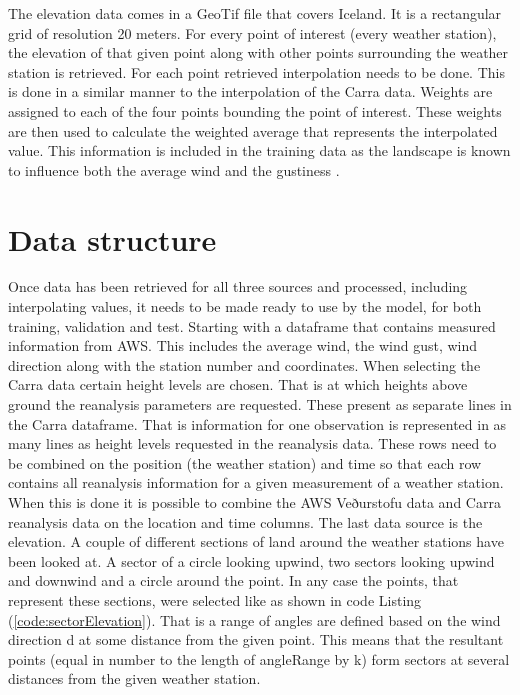 The elevation data comes in a GeoTif file that covers Iceland. It is a rectangular grid of resolution 20 meters. For every point of interest (every weather station), the elevation of that given point along with other points surrounding the weather station is retrieved. For each point retrieved interpolation needs to be done. This is done in a similar manner to the interpolation of the Carra data. Weights are assigned to each of the four points bounding the point of interest. These weights are then used to calculate the weighted average that represents the interpolated value. This information is included in the training data as the landscape is known to influence both the average wind and the gustiness \cite{GNP_vidtal}. 


\section{Data structure}

Once data has been retrieved for all three sources and processed, including interpolating values, it needs to be made ready to use by the model, for both training, validation and test. Starting with a dataframe that contains measured information from AWS. This includes the average wind, the wind gust, wind direction along with the station number and coordinates. When selecting the Carra data certain height levels are chosen. That is at which heights above ground the reanalysis parameters are requested. These present as separate lines in the Carra dataframe. That is information for one observation is represented in as many lines as height levels requested in the reanalysis data. These rows need to be combined on the position (the weather station) and time so that each row contains all reanalysis information for a given measurement of a weather station. When this is done it is possible to combine the AWS Veðurstofu data and Carra reanalysis data on the location and time columns. The last data source is the elevation. A couple of different sections of land around the weather stations have been looked at. A sector of a circle looking upwind, two sectors looking upwind and downwind and a circle around the point. In any case the points, that represent these sections, were selected like as shown in code Listing (\ref{code:sectorElevation}). That is a range of angles are defined based on the wind direction d at some distance from the given point. This means that the resultant points (equal in number to the length of angleRange by k) form sectors at several distances from the given weather station.

